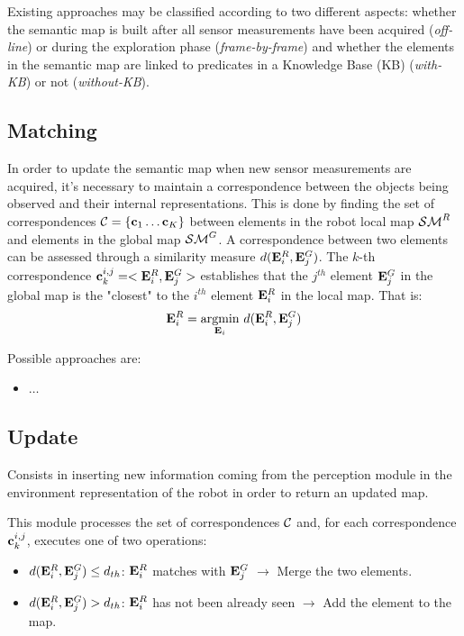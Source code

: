 \documentclass[letterpaper, 10 pt, conference]{ieeeconf}  %
\def\argmin{\mathop{\rm argmin}}
\begin{document}
Existing approaches may be classified according to two different aspects: whether the semantic map is built after all sensor measurements have been acquired (\emph{off-line}) or during the exploration phase (\emph{frame-by-frame}) and whether the elements in the semantic map are linked to predicates in a Knowledge Base (KB) (\emph{with-KB}) or not (\emph{without-KB}).

\subsection{Matching}

In order to update the semantic map when new sensor measurements are acquired, it's necessary to maintain a correspondence between the objects being observed and their internal representations. This is done by finding the set of correspondences $\mathcal{C} = \{\mathbf{c}_1 \dots \mathbf{c}_K\}$ between elements in the robot local map $\mathcal{SM}^R$ and elements in the global map $\mathcal{SM}^G$. A correspondence between two elements can be assessed through a similarity measure $d(\mathbf{E}_i^R,\mathbf{E}_j^G)$. The $k$-th correspondence $\mathbf{c}^{i,j}_k = <\mathbf{E}_i^R,\mathbf{E}_j^G>$ establishes that the $j^{th}$ element $\mathbf{E}_j^G$ in the global map is the "closest" to the $i^{th}$ element $\mathbf{E}_i^R$ in the local map. That is:
\begin{equation}
\bE_i^R = \argmin_{\bE_i} \, d(\bE_i^R,\bE_j^G)
\end{equation} 

Possible approaches are:
\begin{itemize}
	\item $\dots$
\end{itemize}

\subsection{Update}

Consists in inserting new information coming from the perception module in the environment representation of the robot in order to return an updated map.

This module processes the set of correspondences $\mathcal{C}$ and, for each correspondence $\mathbf{c}^{i,j}_k$, executes one of two operations:
\begin{itemize}
	\item $d(\mathbf{E}_i^R,\mathbf{E}_j^G) \leq d_{th}$: $\mathbf{E}_i^R$ matches with $\mathbf{E}_j^G$ $\rightarrow$ Merge the two elements.
	\item $d(\mathbf{E}_i^R,\mathbf{E}_j^G) > d_{th}$: $\mathbf{E}_i^R$ has not been already seen $\rightarrow$ Add the element to the map.
\end{itemize}
\end{document}
